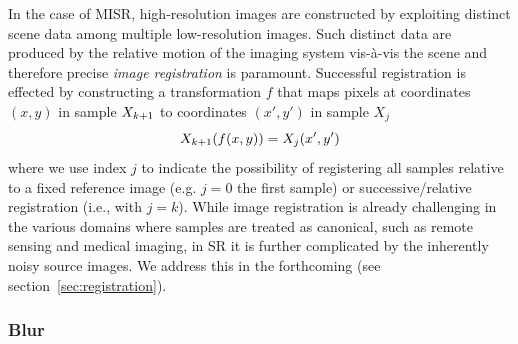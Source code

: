 In the case of MISR, high-resolution images are constructed by exploiting distinct scene data among multiple low-resolution images.
%
Such distinct data are produced by the relative motion of the imaging system vis-à-vis the scene and therefore precise \textit{image registration} is paramount.
%
Successful registration is effected by constructing a transformation \(f\) that maps pixels at coordinates \((x,y)\) in sample \(X_{k+1}\) to coordinates \((x',y')\) in sample \(X_j\)
\begin{equation}
	\Xkone(f(x, y)) = X_j(x',y')
	\label{eqn:registration}
\end{equation}
where we use index \(j\) to indicate the possibility of registering all samples relative to a fixed reference image (e.g. \(j=0\) the first sample) or successive/relative registration (i.e., with \(j=k\)).
%
While image registration is already challenging in the various domains where samples are treated as canonical, such as remote sensing and medical imaging, in SR it is further complicated by the inherently noisy source images. 
%
We address this in the forthcoming (see section~\ref{sec:registration}).

\subsubsection{Blur}


